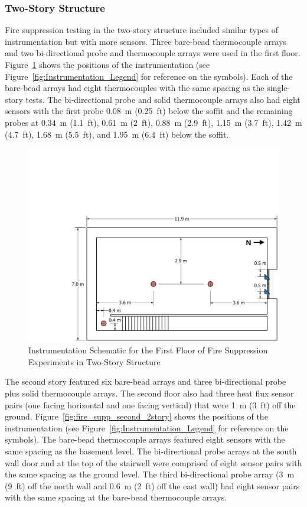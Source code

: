 \documentclass[12pt,oneside]{book}
\begin{document}
\subsubsection*{Two-Story Structure}

Fire suppression testing in the two-story structure included similar types of instrumentation but with more sensors. Three bare-bead thermocouple arrays and two bi-directional probe and thermocouple arrays were used in the first floor. Figure~\ref{fig:fire_supp_first_2story} shows the positions of the instrumentation (see Figure~\ref{fig:Instrumentation_Legend} for reference on the symbols). Each of the bare-bead arrays had eight thermocouples with the same spacing as the single-story tests. The bi-directional probe and solid thermocouple arrays also had eight sensors with the first probe 0.08~m (0.25~ft) below the soffit and the remaining probes at 0.34~m (1.1~ft), 0.61~m (2~ft), 0.88~m (2.9~ft), 1.15~m (3.7~ft), 1.42~m (4.7~ft), 1.68~m (5.5~ft), and 1.95~m (6.4~ft) below the soffit.

\begin{figure}[!ht]
	\includegraphics[width=\columnwidth]{../../DelCo_2014_2015/Drawings/PDFs/CAFS/West_Structure_1st_Floor_Instrumentation}
	\caption{Instrumentation Schematic for the First Floor of Fire Suppression Experiments in Two-Story Structure}
	\label{fig:fire_supp_first_2story}
\end{figure}

The second story featured six bare-bead arrays and three bi-directional probe plus solid thermocouple arrays. The second floor also had three heat flux sensor pairs (one facing horizontal and one facing vertical) that were 1~m (3~ft) off the ground. Figure~\ref{fig:fire_supp_second_2story} shows the positions of the instrumentation (see Figure~\ref{fig:Instrumentation_Legend} for reference on the symbols). The bare-bead thermocouple arrays featured eight sensors with the same spacing as the basement level. The bi-directional probe arrays at the south wall door and at the top of the stairwell were comprised of eight sensor pairs with the same spacing as the ground level. The third bi-directional probe array (3~m (9~ft) off the north wall and 0.6~m (2~ft) off the east wall) had eight sensor pairs with the same spacing at the bare-bead thermocouple arrays.
\end{document}
